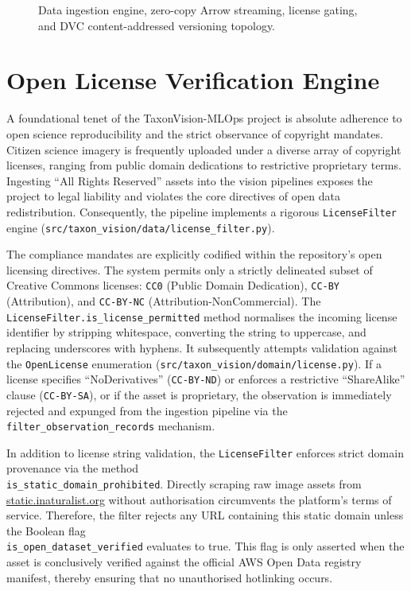 \begin{figure}[htbp]
\centering
\resizebox{\textwidth}{!}{}
\caption{Data ingestion engine, zero-copy Arrow streaming, license gating, and DVC content-addressed versioning topology.}
\label{fig:data_arrow_dvc_pipeline}
\end{figure}

\section{Open License Verification Engine}
\label{sec:license_verification_engine}

A foundational tenet of the TaxonVision-MLOps project is absolute adherence to open science reproducibility and the strict observance of copyright mandates. Citizen science imagery is frequently uploaded under a diverse array of copyright licenses, ranging from public domain dedications to restrictive proprietary terms. Ingesting ``All Rights Reserved'' assets into the vision pipelines exposes the project to legal liability and violates the core directives of open data redistribution. Consequently, the pipeline implements a rigorous \texttt{LicenseFilter} engine (\texttt{src/taxon\_vision/data/license\_filter.py}).

The compliance mandates are explicitly codified within the repository's open licensing directives. The system permits only a strictly delineated subset of Creative Commons licenses: \texttt{CC0} (Public Domain Dedication), \texttt{CC-BY} (Attribution), and \texttt{CC-BY-NC} (Attribution-NonCommercial). The \texttt{LicenseFilter.is\_license\_permitted} method normalises the incoming license identifier by stripping whitespace, converting the string to uppercase, and replacing underscores with hyphens. It subsequently attempts validation against the \texttt{OpenLicense} enumeration (\texttt{src/taxon\_vision/domain/license.py}). If a license specifies ``NoDerivatives'' (\texttt{CC-BY-ND}) or enforces a restrictive ``ShareAlike'' clause (\texttt{CC-BY-SA}), or if the asset is proprietary, the observation is immediately rejected and expunged from the ingestion pipeline via the \texttt{filter\_observation\_records} mechanism.

In addition to license string validation, the \texttt{LicenseFilter} enforces strict domain provenance via the method\\\texttt{is\_static\_domain\_prohibited}. Directly scraping raw image assets from\\\url{static.inaturalist.org} without authorisation circumvents the platform's terms of service. Therefore, the filter rejects any URL containing this static domain unless the Boolean flag\\\texttt{is\_open\_dataset\_verified} evaluates to true. This flag is only asserted when the asset is conclusively verified against the official AWS Open Data registry manifest, thereby ensuring that no unauthorised hotlinking occurs.

